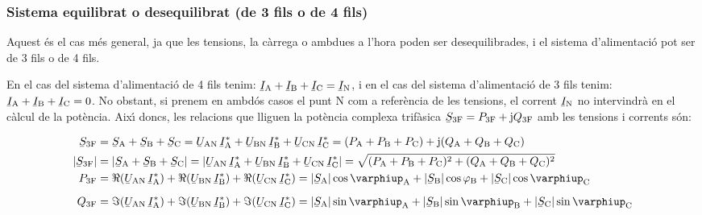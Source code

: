 \subsubsection{Sistema equilibrat o desequilibrat (de 3 fils o de 4 fils)}

Aquest \'{e}s el cas m\'{e}s general, ja que les tensions, la c\`{a}rrega o
ambdues a l'hora  poden ser desequilibrades, i el sistema
d'alimentaci\'{o} pot ser de 3 fils o de 4 fils.

En el cas del sistema d'alimentaci\'{o} de 4 fils tenim:
$\cmplx{I}\ped{A}+\cmplx{I}\ped{B}+\cmplx{I}\ped{C}=\cmplx{I}\ped{N}$, i
en el cas del sistema d'alimentaci\'{o} de 3 fils tenim:
$\cmplx{I}\ped{A}+\cmplx{I}\ped{B}+\cmplx{I}\ped{C}=0$. No obstant,
si prenem en ambd\'{o}s casos el punt N com a refer\`{e}ncia de les
tensions, el corrent $\cmplx{I}\ped{N}$ no intervindr\`{a} en el c\`{a}lcul de
la pot\`{e}ncia. Aix\'{\i} doncs, les relacions que lliguen la pot\`{e}ncia
complexa trif\`{a}sica $\cmplx{S}\ped{3F} = P\ped{3F} + \ju Q\ped{3F}$
amb les tensions i corrents s\'{o}n:

\begin{align}
    \cmplx{S}\ped{3F} &= \cmplx{S}\ped{A} + \cmplx{S}\ped{B} + \cmplx{S}\ped{C} =
     \cmplx{U}\ped{AN}\, \cmplx{I}\ped{A}^* +
    \cmplx{U}\ped{BN} \,\cmplx{I}\ped{B}^* +  \cmplx{U}\ped{CN}\, \cmplx{I}\ped{C}^* =
    (P\ped{A} + P\ped{B} + P\ped{C}) + \ju (Q\ped{A} + Q\ped{B} + Q\ped{C}) \label{eq:s_3f} \\
    |\cmplx{S}\ped{3F}| &= |\cmplx{S}\ped{A} + \cmplx{S}\ped{B} + \cmplx{S}\ped{C}| =
    |\cmplx{U}\ped{AN}\, \cmplx{I}\ped{A}^* +
    \cmplx{U}\ped{BN} \,\cmplx{I}\ped{B}^* +  \cmplx{U}\ped{CN}\, \cmplx{I}\ped{C}^*| =
    \sqrt{(P\ped{A} + P\ped{B} + P\ped{C})^2 + (Q\ped{A} + Q\ped{B} + Q\ped{C})^2} \label{eq:s_3f_mod} \\
    P\ped{3F} &= \Re(\cmplx{U}\ped{AN} \,\cmplx{I}\ped{A}^*) +
    \Re(\cmplx{U}\ped{BN} \,\cmplx{I}\ped{B}^*) +  \Re(\cmplx{U}\ped{CN}\,
    \cmplx{I}\ped{C}^*) = |\cmplx{S}\ped{A}| \cos \varphiup\ped{A} + |\cmplx{S}\ped{B}| \cos
    \varphi\ped{B} + |\cmplx{S}\ped{C}| \cos \varphiup\ped{C} \\[2mm]
    Q\ped{3F} &= \Im(\cmplx{U}\ped{AN} \,\cmplx{I}\ped{A}^*) +
    \Im(\cmplx{U}\ped{BN} \,\cmplx{I}\ped{B}^*) +  \Im(\cmplx{U}\ped{CN}\,
    \cmplx{I}\ped{C}^*) = |\cmplx{S}\ped{A}| \sin \varphiup\ped{A} + |\cmplx{S}\ped{B}| \sin
    \varphiup\ped{B} + |\cmplx{S}\ped{C}| \sin \varphiup\ped{C}
\end{align}

